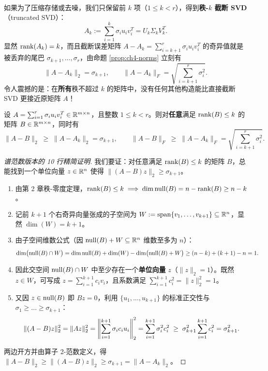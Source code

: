 如果为了压缩存储或去噪，我们只保留前 $k$ 项（$1 \le k < r$），得到\textbf{秩-$k$ 截断 SVD}（truncated SVD）：
\[
  A_k := \sum_{i=1}^k \sigma_i u_i v_i^T = U_k \Sigma_k V_k^T.
\]
显然 $\operatorname{rank}(A_k) = k$，而且截断误差矩阵 $A - A_k = \sum_{i=k+1}^r \sigma_i u_i v_i^T$ 的奇异值就是被丢弃的尾巴 $\sigma_{k+1}, \dots, \sigma_r$，由命题 \ref{prop:ch4-norms} 立刻有
\[
  \|A - A_k\|_2 = \sigma_{k+1}, \qquad \|A - A_k\|_F = \sqrt{\sum_{i=k+1}^r \sigma_i^2}.
\]
令人震撼的是：在\textbf{所有}秩不超过 $k$ 的矩阵中，没有任何其他构造能比直接截断 SVD 更接近原矩阵 $A$！

\begin{thmBox}
\begin{theorem}
\label{thm:ch4-eym}
设 $A = \sum_{i=1}^r \sigma_i u_i v_i^T \in \mathbb{R}^{m\times n}$，且整数 $1 \le k < r$。则对\textbf{任意}满足 $\operatorname{rank}(B) \le k$ 的矩阵 $B \in \mathbb{R}^{m\times n}$，同时有
\begin{equation}
  \|A - B\|_2 \;\ge\; \|A - A_k\|_2 = \sigma_{k+1}, \qquad
  \|A - B\|_F \;\ge\; \|A - A_k\|_F = \sqrt{\sum_{i=k+1}^r \sigma_i^2}. \label{eq:ch4-eym}
\end{equation}
\end{theorem}
\end{thmBox}

\begin{proof}[谱范数版本的 10 行精简证明]
我们要证：对任意满足 $\operatorname{rank}(B) \le k$ 的矩阵 $B$，总能找到一个单位向量 $z \in \mathbb{R}^n$ 使得 $\|(A-B)z\|_2 \ge \sigma_{k+1}$。
\begin{enumerate}
  \item 由第 2 章秩-零度定理，$\operatorname{rank}(B) \le k \implies \dim\operatorname{null}(B) = n - \operatorname{rank}(B) \ge n - k$。
  \item 记前 $k+1$ 个右奇异向量张成的子空间为 $W := \operatorname{span}\{v_1, \dots, v_{k+1}\} \subseteq \mathbb{R}^n$，显然 $\dim(W) = k+1$。
  \item 由子空间维数公式（因 $\operatorname{null}(B) + W \subseteq \mathbb{R}^n$ 维数至多为 $n$）：
  \[
    \dim\bigl(\operatorname{null}(B) \cap W\bigr) = \dim\operatorname{null}(B) + \dim(W) - \dim\bigl(\operatorname{null}(B) + W\bigr) \ge (n - k) + (k + 1) - n = 1.
  \]
  \item 因此交空间 $\operatorname{null}(B) \cap W$ 中至少存在一个\textbf{单位向量} $z$（$\|z\|_2 = 1$）。既然 $z \in W$，可写成 $z = \sum_{i=1}^{k+1} c_i v_i$，且系数满足 $\sum_{i=1}^{k+1} c_i^2 = \|z\|_2^2 = 1$。
  \item 又因 $z \in \operatorname{null}(B)$ 即 $Bz = 0$，利用 $\{u_1,\dots,u_{k+1}\}$ 的标准正交性与 $\sigma_1 \ge \dots \ge \sigma_{k+1}$：
  \[
    \|(A - B)z\|_2^2 = \|Az\|_2^2
    = \left\|\sum_{i=1}^{k+1} \sigma_i c_i u_i\right\|_2^2
    = \sum_{i=1}^{k+1} \sigma_i^2 c_i^2
    \;\ge\; \sigma_{k+1}^2 \sum_{i=1}^{k+1} c_i^2
    = \sigma_{k+1}^2.
  \]
\end{enumerate}
两边开方并由算子 2-范数定义，得 $\|A - B\|_2 \ge \|(A - B)z\|_2 \ge \sigma_{k+1} = \|A - A_k\|_2$。
\end{proof}

